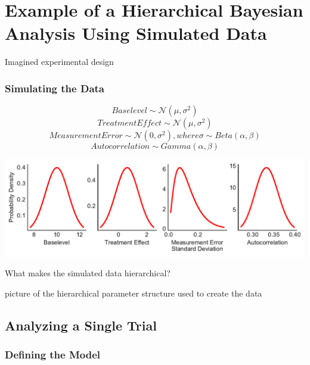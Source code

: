 \documentclass[12pt,a4paper,leqno]{report}
\theoremstyle{plain}
\theoremstyle{definition}
\theoremstyle{remark}
\begin{document}
\chapter{Example of a Hierarchical Bayesian Analysis Using Simulated Data}\label{example}

Imagined experimental design

\subsection{Simulating the Data}

\begin{def}\label{populationparameters}
    \begin{equation}
        Baselevel \sim \mathcal{N}(\mu,\sigma^2)
    \end{equation}
    \begin{equation}
        Treatment Effect \sim \mathcal{N}(\mu,\sigma^2)
    \end{equation}
    \begin{equation}
        Measurement Error \sim \mathcal{N}(0,\sigma^2), where \sigma \sim Beta(\alpha, \beta)
    \end{equation}
    \begin{equation}
        Autocorrelation \sim Gamma(\alpha, \beta)
    \end{equation}
\end{def}

\bigskip
{
    \centering
    \includegraphics{population_parameter_distributions.pdf}
    \par
}
\bigskip


What makes the simulated data hierarchical?

picture of the hierarchical parameter structure used to create the data

\section{Analyzing a Single Trial}\label{1trial}

\subsection{Defining the Model}\label{1model}
\end{document}
